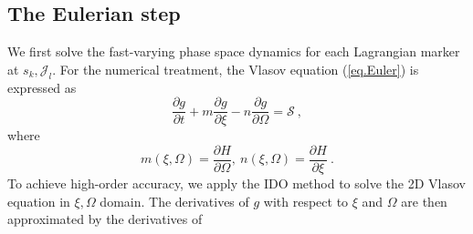 \documentclass[times,12pt,3p,longtitle]{elsarticle}
\begin{document}
\subsection{The Eulerian step}
We first solve the fast-varying phase space dynamics for each Lagrangian marker at $s_k,\mathcal{J}_l$.
For the numerical treatment, the Vlasov equation (\ref{eq.Euler}) is expressed as
\begin{equation}\label{eq.Euler2}
    \frac{\partial g}{\partial t} + m \frac{\partial  g}{\partial \xi} - n \frac{\partial  g}{\partial \Omega}= \mathcal{S}~,
\end{equation}
where 
\begin{equation}
        m(\xi,\Omega) = \frac{\partial H}{\partial \Omega},~ n(\xi,\Omega) = \frac{\partial H}{\partial \xi}~.
\end{equation}
To achieve high-order accuracy, we apply the IDO method \cite{imadera2009} to solve the 2D Vlasov equation in $\xi,\Omega$ domain.
The derivatives of $g$ with respect to $\xi$ and $\Omega$ are then approximated by 
the derivatives of 
\end{document}
